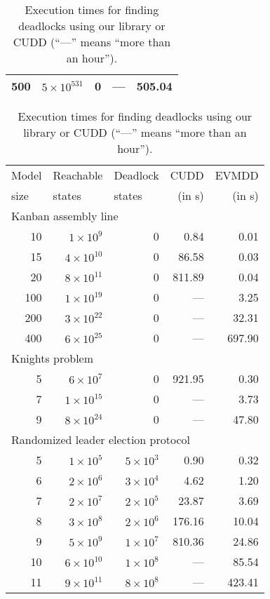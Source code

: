 \documentclass[a4paper,oneside,11pt,pdftex]{llncs}
\begin{document}
\begin{table}[htb]
\begin{center}
\begin{tabular}{|r||r|r||r|r|}
      500 & $5\times10^{531}$ & 0 &   --- &  505.04 \\
      \hline
    \end{tabular}
    \hspace{1cm}
    \begin{tabular}{|r||r|r||r|r|}
      \hline
      \multicolumn{1}{|l||}{Model} & \multicolumn{1}{l|}{Reachable} & \multicolumn{1}{|l||}{Deadlock} & CUDD & EVMDD \\
      \multicolumn{1}{|l||}{size}  & \multicolumn{1}{l|}{states} & \multicolumn{1}{|l||}{states} & (in s) & (in s) \\
      \hline
      \multicolumn{5}{|l|}{Kanban assembly line}\\
      \hline
      10 & $1\times10^{9}$ & 0 &    0.84 &    0.01 \\
      15 & $4\times10^{10}$ & 0 &   86.58 &    0.03 \\
      20 & $8\times10^{11}$ & 0 &  811.89 &    0.04 \\
      100 & $1\times10^{19}$ & 0 &   --- &    3.25 \\
      200 & $3\times10^{22}$ & 0 &   --- &   32.31 \\
      400 & $6\times10^{25}$ & 0 &   --- &  697.90 \\
      \hline
      \multicolumn{5}{|l|}{Knights problem}\\
      \hline
      5 & $6\times10^{7}$ & 0 &  921.95 &    0.30 \\
      7 & $1\times10^{15}$ & 0 &   --- &    3.73 \\
      9 & $8\times10^{24}$ & 0 &   --- &   47.80 \\
      \hline
      \multicolumn{5}{|l|}{Randomized leader election protocol}\\
      \hline
      5 & $1\times10^{5}$ & $5\times10^{3}$ &    0.90 &    0.32 \\
      6 & $2\times10^{6}$ & $3\times10^{4}$ &    4.62 &    1.20 \\
      7 & $2\times10^{7}$ & $2\times10^{5}$ &   23.87 &    3.69 \\
      8 & $3\times10^{8}$ & $2\times10^{6}$ &  176.16 &   10.04 \\
      9 & $5\times10^{9}$ & $1\times10^{7}$ &  810.36 &   24.86 \\
      10 & $6\times10^{10}$ & $1\times10^{8}$ &   --- &   85.54 \\
      11 & $9\times10^{11}$ & $8\times10^{8}$ &   --- &  423.41 \\
      \hline
    \end{tabular}
\vspace*{3mm}
    \caption{Execution times for finding deadlocks using our library or CUDD (``---'' means ``more than an hour'').}
    \label{table-results}
  \end{center}
\end{table}
\vspace*{-5mm}
\end{document}
